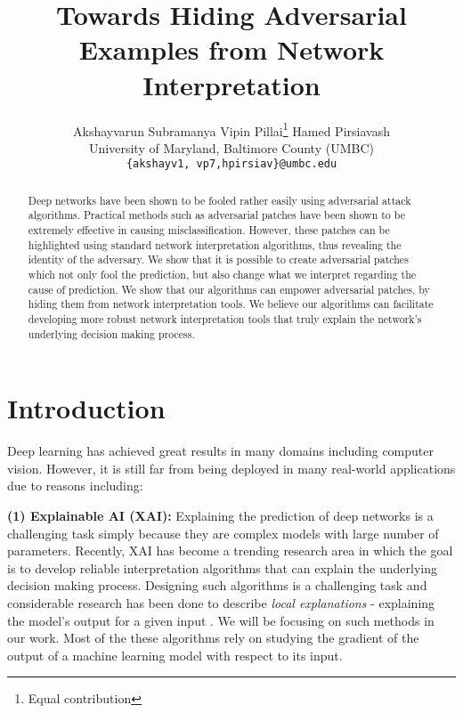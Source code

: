 \documentclass[10pt,twocolumn,letterpaper]{article}
\begin{document}
\title{Towards Hiding Adversarial Examples from Network Interpretation}

\author{
     Akshayvarun Subramanya\footnotemark[1] \qquad
     Vipin Pillai\thanks{Equal contribution} \qquad Hamed Pirsiavash\\
    University of Maryland, Baltimore County (UMBC)\\
    \tt\small{\{akshayv1, vp7,hpirsiav\}@umbc.edu} \\
}


\maketitle

\begin{abstract}

Deep networks have been shown to be fooled rather easily using adversarial attack algorithms.
Practical methods such as adversarial patches have been shown to be extremely effective in causing misclassification. However, these patches can be highlighted using standard network interpretation algorithms, thus revealing the identity of the adversary.
We show that it is possible to create adversarial patches which not only fool the prediction, but also change what we interpret regarding the cause of prediction. We show that our algorithms can empower adversarial patches, by hiding them from network interpretation tools. We believe our algorithms can facilitate developing more robust network interpretation tools that truly explain the network's underlying decision making process.


\end{abstract}

\section{Introduction}
Deep learning has achieved great results in many domains including computer vision. However, it is still far from being deployed in many real-world applications due to reasons including:

{\bf (1) Explainable AI (XAI):} Explaining the prediction of deep networks is a challenging task simply because they are complex models with large number of parameters. Recently, XAI has become a trending research area in which the goal is to develop reliable interpretation algorithms that can explain the underlying decision making process. Designing such algorithms is a challenging task and considerable research \cite{simonyan2013deep,zhou2016learning,selvaraju2016grad} has been done to describe \textit{local explanations} - explaining the model's output for a given input \cite{baehrens2010explain}. We will be focusing on such methods in our work. Most of the these algorithms rely on studying the gradient of the output of a machine learning model with respect to its input.
\end{document}
